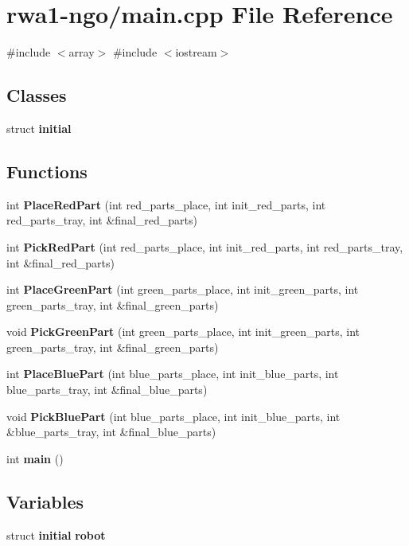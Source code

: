 \section{rwa1-\/ngo/main.cpp File Reference}
\label{main_8cpp}
{\ttfamily \#include $<$array$>$}\newline
{\ttfamily \#include $<$iostream$>$}\newline
\subsection*{Classes}
\begin{DoxyCompactItemize}
\item 
struct \textbf{ initial}
\end{DoxyCompactItemize}
\subsection*{Functions}
\begin{DoxyCompactItemize}
\item 
int \textbf{ Place\+Red\+Part} (int red\+\_\+parts\+\_\+place, int init\+\_\+red\+\_\+parts, int red\+\_\+parts\+\_\+tray, int \&final\+\_\+red\+\_\+parts)
\item 
int \textbf{ Pick\+Red\+Part} (int red\+\_\+parts\+\_\+place, int init\+\_\+red\+\_\+parts, int red\+\_\+parts\+\_\+tray, int \&final\+\_\+red\+\_\+parts)
\item 
int \textbf{ Place\+Green\+Part} (int green\+\_\+parts\+\_\+place, int init\+\_\+green\+\_\+parts, int green\+\_\+parts\+\_\+tray, int \&final\+\_\+green\+\_\+parts)
\item 
void \textbf{ Pick\+Green\+Part} (int green\+\_\+parts\+\_\+place, int init\+\_\+green\+\_\+parts, int green\+\_\+parts\+\_\+tray, int \&final\+\_\+green\+\_\+parts)
\item 
int \textbf{ Place\+Blue\+Part} (int blue\+\_\+parts\+\_\+place, int init\+\_\+blue\+\_\+parts, int blue\+\_\+parts\+\_\+tray, int \&final\+\_\+blue\+\_\+parts)
\item 
void \textbf{ Pick\+Blue\+Part} (int blue\+\_\+parts\+\_\+place, int init\+\_\+blue\+\_\+parts, int \&blue\+\_\+parts\+\_\+tray, int \&final\+\_\+blue\+\_\+parts)
\item 
int \textbf{ main} ()
\end{DoxyCompactItemize}
\subsection*{Variables}
\begin{DoxyCompactItemize}
\item 
struct \textbf{ initial} \textbf{ robot}
\end{DoxyCompactItemize}


